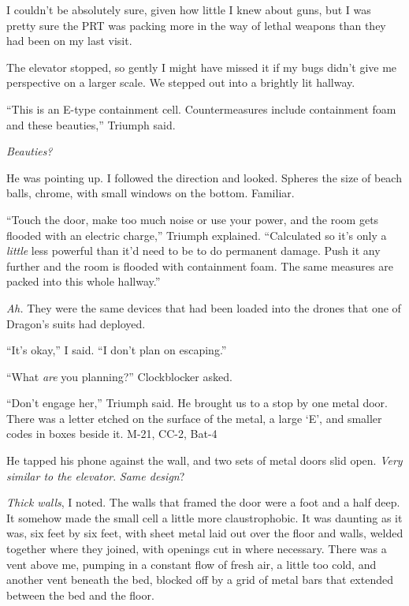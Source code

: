 I couldn't be absolutely sure, given how little I knew about guns, but I was pretty sure the PRT was packing more in the way of lethal weapons than they had been on my last visit.



The elevator stopped, so gently I might have missed it if my bugs didn't give me perspective on a larger scale.  We stepped out into a brightly lit hallway.



``This is an E-type containment cell.  Countermeasures include containment foam and these beauties,'' Triumph said.



\emph{Beauties?}



He was pointing up.  I followed the direction and looked.  Spheres the size of beach balls, chrome, with small windows on the bottom.  Familiar.



``Touch the door, make too much noise or use your power, and the room gets flooded with an electric charge,'' Triumph explained.  ``Calculated so it's only a \emph{little} less powerful than it'd need to be to do permanent damage.  Push it any further and the room is flooded with containment foam.  The same measures are packed into this whole hallway.''



\emph{Ah.  }They were the same devices that had been loaded into the drones that one of Dragon's suits had deployed.



``It's okay,'' I said.  ``I don't plan on escaping.''



``What \emph{are} you planning?'' Clockblocker asked.



``Don't engage her,'' Triumph said.  He brought us to a stop by one metal door.  There was a letter etched on the surface of the metal, a large `E', and smaller codes in boxes beside it.  M-21, CC-2, Bat-4



He tapped his phone against the wall, and two sets of metal doors slid open.  \emph{Very similar to the elevator}.  \emph{Same design}?



\emph{Thick walls}, I noted.  The walls that framed the door were a foot and a half deep.  It somehow made the small cell a little more claustrophobic.  It was daunting as it was, six feet by six feet, with sheet metal laid out over the floor and walls, welded together where they joined, with openings cut in where necessary.  There was a vent above me, pumping in a constant flow of fresh air, a little too cold, and another vent beneath the bed, blocked off by a grid of metal bars that extended between the bed and the floor.



